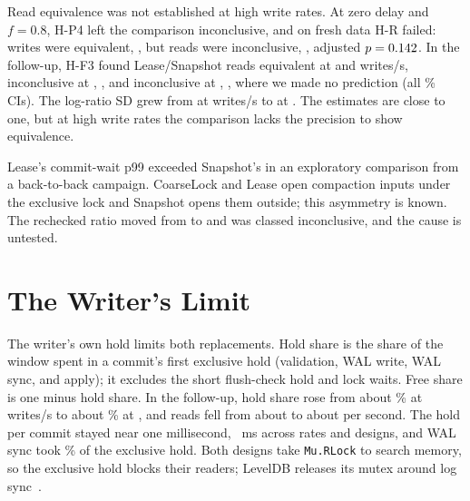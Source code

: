 \documentclass[conference]{IEEEtran}
\begin{document}
Read equivalence was not established at high write rates. At zero delay and $f=0.8$, H-P4 left the comparison inconclusive, and on fresh data H-R failed: writes were equivalent, \SettledHRWrite{}, but reads were inconclusive, \SettledHRRead{}, adjusted $p=0.142$. In the follow-up, H-F3 found Lease/Snapshot reads equivalent at \FollowRateLow{} and \FollowRateSecond{} writes/s, inconclusive at \FollowRateThird{}, \FollowRatioThird{}, and inconclusive at \FollowRateHigh{}, \FollowRatioHigh{}, where we made no prediction (all \FollowCI{}\% CIs). The log-ratio SD grew from \FollowSDLow{} at \FollowRateLow{} writes/s to \FollowSDHigh{} at \FollowRateHigh{}. The estimates are close to one, but at high write rates the comparison lacks the precision to show equivalence.

Lease's commit-wait p99 exceeded Snapshot's in an exploratory comparison from a back-to-back campaign. CoarseLock and Lease open compaction inputs under the exclusive lock and Snapshot opens them outside; this asymmetry is known. The rechecked ratio moved from \SettledCOneTailOld{} to \SettledCOneTailNew{} and was classed inconclusive, and the cause is untested.

\section{The Writer's Limit}
\label{sec:writer}
The writer's own hold limits both replacements. Hold share is the share of the window spent in a commit's first exclusive hold (validation, WAL write, WAL sync, and apply); it excludes the short flush-check hold and lock waits. Free share is one minus hold share. In the follow-up, hold share rose from about \FollowHoldAboutLow{}\% at \FollowRateLow{} writes/s to about \FollowHoldAboutHigh{}\% at \FollowRateHigh{}, and reads fell from about \FollowReadsAboutLow{} to about \FollowReadsAboutHigh{} per second. The hold per commit stayed near one millisecond, \HoldMsRange{}~ms across rates and designs, and WAL sync took \FsyncShareRange{}\% of the exclusive hold. Both designs take \texttt{Mu.RLock} to search memory, so the exclusive hold blocks their readers; LevelDB releases its mutex around log sync~\cite{leveldb}.
\end{document}
